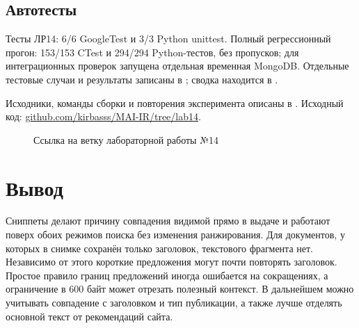 \documentclass[12pt,a4paper]{article}
\begin{document}
\subsection{Автотесты}
Тесты ЛР14: 6/6 GoogleTest и 3/3 Python unittest. Полный регрессионный
прогон: 153/153 CTest и 294/294 Python-тестов, без пропусков;
для интеграционных проверок запущена отдельная временная MongoDB.
Отдельные тестовые случаи и результаты записаны в
; сводка находится в
.

Исходники, команды сборки и повторения эксперимента описаны в
. Исходный код:
\href{https://github.com/kirbasss/MAI-IR/tree/lab14}{github.com/kirbasss/MAI-IR/tree/lab14}.
\begin{figure}[H]
\centering
\begingroup\hypersetup{urlcolor=black}
\endgroup
\caption{Ссылка на ветку лабораторной работы №14}
\end{figure}

\section{Вывод}
Сниппеты делают причину совпадения видимой прямо в выдаче и работают
поверх обоих режимов поиска без изменения ранжирования. Для документов,
у которых в снимке сохранён только заголовок, текстового фрагмента нет.
Независимо от этого короткие предложения могут почти повторять заголовок.
Простое правило границ предложений иногда ошибается на сокращениях,
а ограничение в 600 байт может отрезать полезный контекст. В дальнейшем
можно учитывать совпадение с заголовком и тип публикации, а также
лучше отделять основной текст от рекомендаций сайта.
\end{document}

